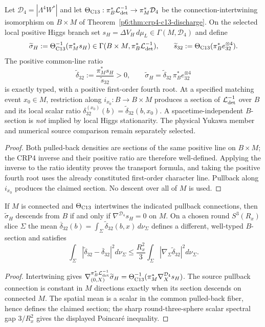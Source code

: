 \documentclass[11pt,a4paper]{article}
\begin{document}
\begin{theorem}
\label{p6:thm:v181-higgs-density-owner-map}
Let $\mathcal D_4=|\Lambda^4W^*|$ and let
$\Theta_{\rm C13}:\pi_B^*\mathcal L_{\rm det}^{-1}\to\pi_M^*\mathcal D_4$
be the connection-intertwining isomorphism on $B\times M$ of
Theorem~\ref{p6:thm:crp4-c13-discharge}.
On the selected local positive Higgs branch set
$s_H=\Delta V_H\,d\mu_L\in\Gamma(M,\mathcal D_4)$ and define
\[
 \widetilde\sigma_H:=\Theta_{\rm C13}^{-1}(\pi_M^*s_H)
 \in\Gamma(B\times M,\pi_B^*\mathcal L_{\rm det}^{-1}),\qquad
 \widetilde s_{32}:=\Theta_{\rm C13}(\pi_B^*e_{32}^{\otimes4}).
\]
The positive common-line ratio
\[
 \boxed{\widetilde\delta_{32}
 :=\frac{\pi_M^*s_H}{\widetilde s_{32}}>0},\qquad
 \widetilde\sigma_H=\widetilde\delta_{32}\,\pi_B^*e_{32}^{\otimes4}
\]
is exactly typed, with a positive first-order fourth root.
At a specified matching event $x_0\in M$, restriction along
$i_{x_0}:B\to B\times M$ produces a section of
$\mathcal L_{\rm det}^{-1}$ over $B$ and its local scalar ratio
$\delta_{32}^{(x_0)}(b)=\widetilde\delta_{32}(b,x_0)$.
A spacetime-independent $B$-section is \emph{not} implied by local
Higgs stationarity. The physical Yukawa member and numerical source
comparison remain separately selected.
\end{theorem}
\begin{proof}
Both pulled-back densities are sections of the same positive line on
$B\times M$; the CRP4 inverse and their positive ratio are therefore
well-defined. Applying the inverse to the ratio identity proves the
transport formula, and taking the positive fourth root uses the already
constituted first-order character line. Pullback along $i_{x_0}$
produces the claimed section. No descent over all of $M$ is used.
\end{proof}
\begin{proposition}
\label{p6:prop:v382-higgs-crp4-descent-criterion}
If $M$ is connected and $\Theta_{\rm C13}$ intertwines the indicated
pullback connections, then $\widetilde\sigma_H$ descends from $B$
if and only if $\nabla^{\mathcal D_4}s_H=0$ on $M$.
On a chosen round $S^3(R_x)$ slice $\Sigma$ the mean
$\overline\delta_{32}(b)=\int_\Sigma\widetilde\delta_{32}(b,x)\,d\nu_\Sigma$
defines a different, well-typed $B$-section and satisfies
\[
 \int_\Sigma|\widetilde\delta_{32}-\overline\delta_{32}|^2d\nu_\Sigma
 \le\frac{R_x^2}{3}\int_\Sigma|\nabla_\Sigma\widetilde\delta_{32}|^2d\nu_\Sigma.
\]
\end{proposition}
\begin{proof}
Intertwining gives
$\nabla^{\pi_B^*\mathcal L^{-1}_{\rm det}}_{(0,X)}\widetilde\sigma_H
 =\Theta_{\rm C13}^{-1}(\pi_M^*\nabla^{\mathcal D_4}_X s_H)$.
The source pullback connection is constant in $M$ directions exactly
when its section descends on connected $M$. The spatial mean is a scalar
in the common pulled-back fiber, hence defines the claimed section;
the sharp round-three-sphere scalar spectral gap $3/R_x^2$
gives the displayed Poincar\'e inequality.
\end{proof}
\end{document}
